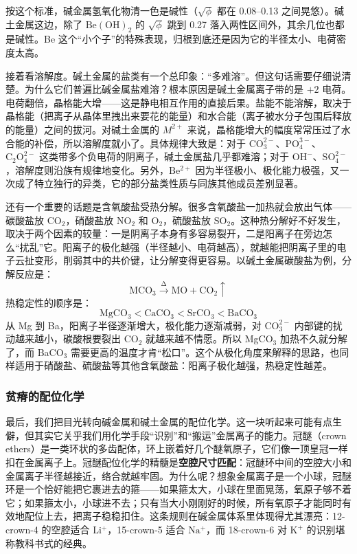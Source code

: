 \documentclass[UTF8]{ctexbook}
\begin{document}
按这个标准，碱金属氢氧化物清一色是碱性（$\sqrt{\phi}$ 都在 0.08--0.13 之间晃悠）。碱土金属这边，除了 $\mathrm{Be(OH)_2}$ 的 $\sqrt{\phi}$ 跳到 0.27 落入两性区间外，其余几位也都是碱性。Be 这个“小个子”的特殊表现，归根到底还是因为它的半径太小、电荷密度太高。

\medskip
\noindent
接着看溶解度。碱土金属的盐类有一个总印象：“多难溶”。但这句话需要仔细说清楚。为什么它们普遍比碱金属盐难溶？根本原因是碱土金属离子带的是 $+2$ 电荷。电荷翻倍，晶格能大增——这是静电相互作用的直接后果。盐能不能溶解，取决于晶格能（把离子从晶体里拽出来要花的能量）和水合能（离子被水分子包围后释放的能量）之间的拔河。对碱土金属的 $M^{2+}$ 来说，晶格能增大的幅度常常压过了水合能的补偿，所以溶解度就小了。具体规律大致是：对于 $\mathrm{CO_3^{2-}}$、$\mathrm{PO_4^{3-}}$、$\mathrm{C_2O_4^{2-}}$ 这类带多个负电荷的阴离子，碱土金属盐几乎都难溶；对于 $\mathrm{OH^-}$、$\mathrm{SO_4^{2-}}$，溶解度则沿族有规律地变化。另外，$\mathrm{Be^{2+}}$ 因为半径极小、极化能力极强，又一次成了特立独行的异类，它的部分盐类性质与同族其他成员差别显著。

\medskip
\noindent
还有一个重要的话题是含氧酸盐受热分解。很多含氧酸盐一加热就会放出气体——碳酸盐放 $\mathrm{CO_2}$，硝酸盐放 $\mathrm{NO_2}$ 和 $\mathrm{O_2}$，硫酸盐放 $\mathrm{SO_2}$。这种热分解好不好发生，取决于两个因素的较量：一是阴离子本身有多容易裂开，二是阳离子在旁边怎么“扰乱”它。阳离子的极化越强（半径越小、电荷越高），就越能把阴离子里的电子云扯变形，削弱其中的共价键，让分解变得更容易。以碱土金属碳酸盐为例，分解反应是：
\[
\mathrm{MCO_3 \stackrel{\Delta}{\longrightarrow} MO + CO_2 \uparrow}
\]
热稳定性的顺序是：
\[
\mathrm{MgCO_3 < CaCO_3 < SrCO_3 < BaCO_3}
\]
从 Mg 到 Ba，阳离子半径逐渐增大，极化能力逐渐减弱，对 $\mathrm{CO_3^{2-}}$ 内部键的扰动越来越小，碳酸根要裂出 $\mathrm{CO_2}$ 就越来越不情愿。所以 MgCO$_3$ 加热不久就分解了，而 BaCO$_3$ 需要更高的温度才肯“松口”。这个从极化角度来解释的思路，也同样适用于硝酸盐、硫酸盐等其他含氧酸盐：阳离子极化越强，热稳定性越差。

\subsubsection{贫瘠的配位化学}

\medskip

最后，我们把目光转向碱金属和碱土金属的配位化学。这一块听起来可能有点生僻，但其实它关乎我们用化学手段“识别”和“搬运”金属离子的能力。冠醚（crown ethers）是一类环状的多齿配体，环上嵌着好几个醚氧原子，它们像一顶皇冠一样扣在金属离子上。冠醚配位化学的精髓是\textbf{空腔尺寸匹配}：冠醚环中间的空腔大小和金属离子半径越接近，络合就越牢固。为什么呢？想象金属离子是一个小球，冠醚环是一个恰好能把它裹进去的箍——如果箍太大，小球在里面晃荡，氧原子够不着它；如果箍太小，小球进不去；只有当大小刚刚好的时候，所有氧原子才能同时有效地配位上去，把离子稳稳扣住。这条规则在碱金属体系里体现得尤其漂亮：12-crown-4 的空腔适合 $\mathrm{Li^+}$，15-crown-5 适合 $\mathrm{Na^+}$，而 18-crown-6 对 $\mathrm{K^+}$ 的识别堪称教科书式的经典。
\end{document}
